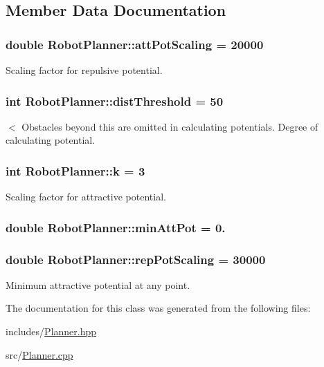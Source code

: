 \subsection{Member Data Documentation}
\hypertarget{classRobotPlanner_aa68f0bb24256b470a8a4d13d858aef7f}{
\subsubsection[{att\-Pot\-Scaling}]{\setlength{\rightskip}{0pt plus 5cm}double Robot\-Planner\-::att\-Pot\-Scaling = 20000}}\label{classRobotPlanner_aa68f0bb24256b470a8a4d13d858aef7f}
Scaling factor for repulsive potential. \hypertarget{classRobotPlanner_aa7d1571a5f12412daa58d79c518c946c}{
\subsubsection[{dist\-Threshold}]{\setlength{\rightskip}{0pt plus 5cm}int Robot\-Planner\-::dist\-Threshold = 50}}\label{classRobotPlanner_aa7d1571a5f12412daa58d79c518c946c}
$<$ Obstacles beyond this are omitted in calculating potentials. Degree of calculating potential. \hypertarget{classRobotPlanner_a18ebcf4ba23a817db1a2fda878120eb4}{
\subsubsection[{k}]{\setlength{\rightskip}{0pt plus 5cm}int Robot\-Planner\-::k = 3}}\label{classRobotPlanner_a18ebcf4ba23a817db1a2fda878120eb4}
Scaling factor for attractive potential. \hypertarget{classRobotPlanner_a199d479764e8e96c37654486ddc1ef7d}{
\subsubsection[{min\-Att\-Pot}]{\setlength{\rightskip}{0pt plus 5cm}double Robot\-Planner\-::min\-Att\-Pot = 0.}}\label{classRobotPlanner_a199d479764e8e96c37654486ddc1ef7d}
\hypertarget{classRobotPlanner_a0b056d74826bddeb6dbd5a458aad0758}{
\subsubsection[{rep\-Pot\-Scaling}]{\setlength{\rightskip}{0pt plus 5cm}double Robot\-Planner\-::rep\-Pot\-Scaling = 30000}}\label{classRobotPlanner_a0b056d74826bddeb6dbd5a458aad0758}
Minimum attractive potential at any point. 

The documentation for this class was generated from the following files\-:\begin{DoxyCompactItemize}
\item 
includes/\hyperlink{Planner_8hpp}{Planner.\-hpp}\item 
src/\hyperlink{Planner_8cpp}{Planner.\-cpp}\end{DoxyCompactItemize}
